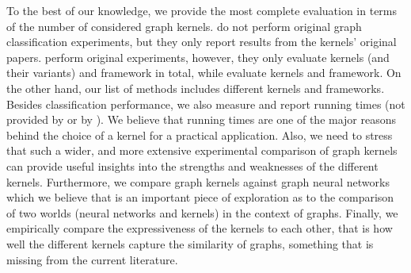 \documentclass[twoside,11pt]{article}
\begin{document}
To the best of our knowledge, we provide the most complete evaluation in terms of the number of considered graph kernels.
 do not perform original graph classification experiments, but they only report results from the kernels' original papers.
 perform original experiments, however, they only evaluate  kernels (and their variants) and  framework in total, while  evaluate  kernels and  framework.
On the other hand, our list of methods includes  different kernels and  frameworks.
Besides classification performance, we also measure and report running times (not provided by  or by ).
We believe that running times are one of the major reasons behind the choice of a kernel for a practical application.
Also, we need to stress that such a wider, and more extensive experimental comparison of graph kernels can provide useful insights into the strengths and weaknesses of the different kernels.
Furthermore, we compare graph kernels against graph neural networks which we believe that is an important piece of exploration as to the comparison of two worlds (neural networks and kernels) in the context of graphs.
Finally, we empirically compare the expressiveness of the kernels to each other, that is how well the different kernels capture the similarity of graphs, something that is missing from the current literature.
\end{document}
